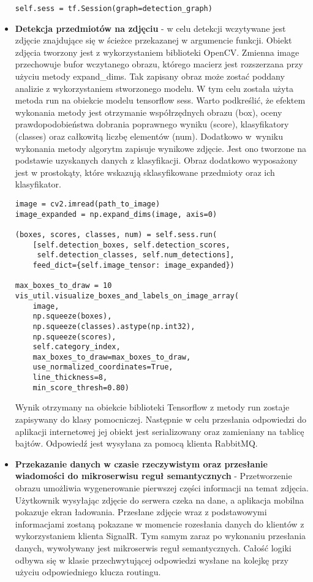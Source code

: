 \begin{itemize}
\begin{lstlisting}[caption={Fragment inicjalizacji obiektów biblioteki Tensorflow.}]
	self.sess = tf.Session(graph=detection_graph)
\end{lstlisting}
\item \textbf{Detekcja przedmiotów na zdjęciu} - w celu detekcji wczytywane jest zdjęcie znajdujące się w ścieżce przekazanej w argumencie funkcji. Obiekt zdjęcia tworzony jest z wykorzystaniem biblioteki OpenCV. Zmienna image przechowuje bufor wczytanego obrazu, którego macierz jest rozszerzana przy użyciu metody expand\_dims. Tak zapisany obraz może zostać poddany analizie z wykorzystaniem stworzonego modelu. W tym celu została użyta metoda run na obiekcie modelu tensorflow sess. Warto podkreślić, że efektem wykonania metody jest otrzymanie współrzędnych obrazu (box), oceny prawdopodobieństwa dobrania poprawnego wyniku (score), klasyfikatory (classes) oraz całkowitą liczbę elementów (num). Dodatkowo w~wyniku wykonania metody algorytm zapisuje wynikowe zdjęcie. Jest ono tworzone na podstawie uzyskanych danych z klasyfikacji. Obraz dodatkowo wyposażony jest w prostokąty, które wskazują sklasyfikowane przedmioty oraz ich klasyfikator.
\newline

\begin{lstlisting}[caption={Detekcja przedmiotów na obrazie.}]
image = cv2.imread(path_to_image)
image_expanded = np.expand_dims(image, axis=0)

(boxes, scores, classes, num) = self.sess.run(
	[self.detection_boxes, self.detection_scores,
	 self.detection_classes, self.num_detections],
	feed_dict={self.image_tensor: image_expanded})

max_boxes_to_draw = 10
vis_util.visualize_boxes_and_labels_on_image_array(
	image,
	np.squeeze(boxes),
	np.squeeze(classes).astype(np.int32),
	np.squeeze(scores),
	self.category_index,
	max_boxes_to_draw=max_boxes_to_draw,
	use_normalized_coordinates=True,
	line_thickness=8,
	min_score_thresh=0.80)
\end{lstlisting}

Wynik otrzymany na obiekcie biblioteki Tensorflow z metody run zostaje zapisywany do klasy pomocniczej. Następnie w celu przesłania odpowiedzi do aplikacji internetowej jej obiekt jest serializowany oraz zamieniany na tablicę bajtów. Odpowiedź jest wysyłana za pomocą klienta RabbitMQ.
\newline

\item \textbf{Przekazanie danych w czasie rzeczywistym oraz przesłanie wiadomości do mikroserwisu reguł semantycznych} - Przetworzenie obrazu umożliwia wygenerowanie pierwszej części informacji na temat zdjęcia. Użytkownik wysyłając zdjęcie do serwera czeka na dane, a aplikacja mobilna pokazuje ekran ładowania. Przesłane zdjęcie wraz z podstawowymi informacjami zostaną pokazane w momencie rozesłania danych do klientów z wykorzystaniem klienta SignalR. Tym samym zaraz po wykonaniu przesłania danych, wywoływany jest mikroserwis reguł semantycznych. Całość logiki odbywa się w klasie przechwytującej odpowiedzi wysłane na kolejkę przy użyciu odpowiedniego klucza routingu.


\end{itemize}
